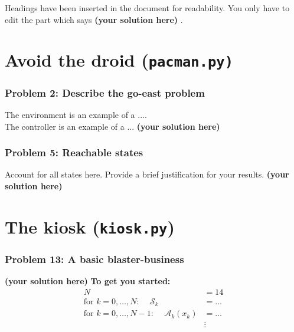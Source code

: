 \documentclass[12pt,twoside]{article}
\newcommand\redt[1]{ {\textcolor[rgb]{0.60, 0.00, 0.00}{\textbf{ #1} } } }
\newcommand{\yoursolution}{ \redt{(your solution here) } }
\begin{document}

Headings have been inserted in the document for readability. You only have to edit the part which says \yoursolution. 

\section{Avoid the droid (\texttt{pacman.py)}} 
\subsubsection*{{\color{red}Problem 2:  Describe the go-east problem}}
	
		The environment is an example of a .... \\		
		The controller is an example of a ...
		\yoursolution 	
	
\subsubsection*{{\color{red}Problem 5:  Reachable states}}
	
Account for all states here. Provide a brief justification for your results. 
		\yoursolution 	
	
\section{The kiosk (\texttt{kiosk.py})}
\subsubsection*{{\color{red}Problem 13:  A basic blaster-business}}

\yoursolution 	
\redt{ To get you started: \begin{align}
	N & = 14 \\
	\mbox{for $k=0,\dots,N$: }\quad	\mathcal{S}_k & = \dots \\
	\mbox{for $k=0,\dots,N-1$: }\quad \mathcal{A}_k(x_k) & = \dots \\
	 & \vdots 
\end{align} }
\end{document}
